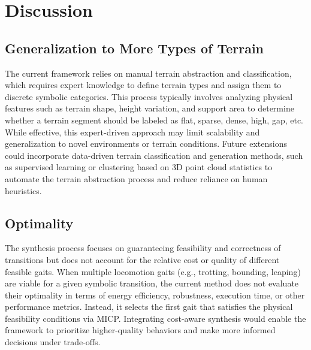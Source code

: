 \section{Discussion}\label{sec:discussion}
\subsection{Generalization to More Types of Terrain}
The current framework relies on manual terrain abstraction and classification, which requires expert knowledge to define terrain types and assign them to discrete symbolic categories. This process typically involves analyzing physical features such as terrain shape, height variation, and support area to determine whether a terrain segment should be labeled as flat, sparse, dense, high, gap, etc. While effective, this expert-driven approach may limit scalability and generalization to novel environments or terrain conditions. Future extensions could incorporate data-driven terrain classification and generation methods, such as supervised learning or clustering based on 3D point cloud statistics to automate the terrain abstraction process and reduce reliance on human heuristics.

\subsection{Optimality}
The synthesis process focuses on guaranteeing feasibility and correctness of transitions but does not account for the relative cost or quality of different feasible gaits. When multiple locomotion gaits (e.g., trotting, bounding, leaping) are viable for a given symbolic transition, the current method does not evaluate their optimality in terms of energy efficiency, robustness, execution time, or other performance metrics. Instead, it selects the first gait that satisfies the physical feasibility conditions via MICP. Integrating cost-aware synthesis would enable the framework to prioritize higher-quality behaviors and make more informed decisions under trade-offs.

